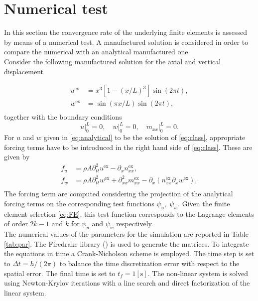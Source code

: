 \documentclass{ifacconf}
\begin{document}
\section{Numerical test}\label{sec:num_test}
In this section the convergence rate of the underlying finite elements is assessed by means of a numerical test. A manufactured solution is considered in order to compare the numerical with an analytical manufactured one. \\

Consider the following manufactured solution for the axial and vertical displacement

\begin{equation}\label{eq:analytical}
	\begin{aligned}
		u^{\text{ex}} &= x^3[1-(x/L)^3] \sin(2 \pi t), \\
		w^{\text{ex}} &= \sin(\pi x/L)\sin(2 \pi t), \\
	\end{aligned}
\end{equation}
together with the boundary conditions
\begin{equation}
u\vert_0^L = 0, \quad w\vert_0^L =0, \quad m_{xx}\vert_{0}^L=0.
\end{equation}
For $u$ and $w$ given in \eqref{eq:analytical} to be the solution of \eqref{eq:class}, appropriate forcing terms have to be introduced in the right hand side of \eqref{eq:class}. These are given by 
\begin{equation}\label{eq:forcing}
	\begin{aligned}
		f_u &= \rho A \partial_{tt}^2 u^{\text{ex}} - \partial_x n_{xx}^{\text{ex}}, \\
		f_w &= \rho A \partial_{tt}^2 w^{\text{ex}} + \partial_{xx}^2 m_{xx}^{\text{ex}} - \partial_x(n_{xx}^{\text{ex}} \partial_x w^{\text{ex}}), \\
	\end{aligned}
\end{equation}
The forcing term are computed considering the projection of the analytical forcing terms on the corresponding test functions $\psi_u, \; \psi_w$. Given the finite element selection \eqref{eq:FE}, this test function corresponds to the Lagrange elements of order $2k-1$ and $k$ for $\psi_u$ and $\psi_w$ respectively. \\

The numerical values of the parameters for the simulation are reported in Table \ref{tab:par}. The Firedrake library (\cite{rathgeber2017firedrake}) is used to generate the matrices. To integrate the equations in time a Crank-Nicholson scheme is employed. The time step is set to $\Delta t = h/(2 \pi)$ to balance the time
discretization error with respect to the spatial error. The final time is set to $t_f = 1 [\textrm{s}]$. The non-linear system is solved using Newton-Krylov iterations with a line search and direct factorization of the linear system.  \\
\end{document}

